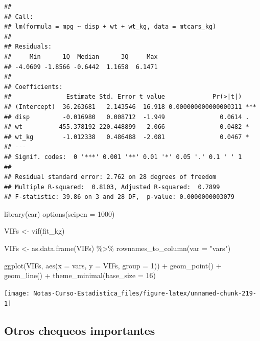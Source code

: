 \documentclass[
  12pt,
]{book}
\newenvironment{Shaded}{\begin{snugshade}}{\end{snugshade}}
\newcommand{\AttributeTok}[1]{\textcolor[rgb]{0.77,0.63,0.00}{#1}}
\newcommand{\DecValTok}[1]{\textcolor[rgb]{0.00,0.00,0.81}{#1}}
\newcommand{\FunctionTok}[1]{\textcolor[rgb]{0.00,0.00,0.00}{#1}}
\newcommand{\NormalTok}[1]{#1}
\newcommand{\OtherTok}[1]{\textcolor[rgb]{0.56,0.35,0.01}{#1}}
\newcommand{\SpecialCharTok}[1]{\textcolor[rgb]{0.00,0.00,0.00}{#1}}
\newcommand{\StringTok}[1]{\textcolor[rgb]{0.31,0.60,0.02}{#1}}
\theoremstyle{definition}
\theoremstyle{definition}
\theoremstyle{definition}
\theoremstyle{remark}
\begin{document}
\begin{verbatim}
## 
## Call:
## lm(formula = mpg ~ disp + wt + wt_kg, data = mtcars_kg)
## 
## Residuals:
##     Min      1Q  Median      3Q     Max 
## -4.0609 -1.8566 -0.6442  1.1658  6.1471 
## 
## Coefficients:
##               Estimate Std. Error t value             Pr(>|t|)    
## (Intercept)  36.263681   2.143546  16.918 0.000000000000000311 ***
## disp         -0.016980   0.008712  -1.949               0.0614 .  
## wt          455.378192 220.448899   2.066               0.0482 *  
## wt_kg        -1.012338   0.486488  -2.081               0.0467 *  
## ---
## Signif. codes:  0 '***' 0.001 '**' 0.01 '*' 0.05 '.' 0.1 ' ' 1
## 
## Residual standard error: 2.762 on 28 degrees of freedom
## Multiple R-squared:  0.8103, Adjusted R-squared:  0.7899 
## F-statistic: 39.86 on 3 and 28 DF,  p-value: 0.0000000003079
\end{verbatim}

\begin{Shaded}
\begin{Highlighting}[]
\FunctionTok{library}\NormalTok{(car)}
\FunctionTok{options}\NormalTok{(}\AttributeTok{scipen =} \DecValTok{1000}\NormalTok{)}

\NormalTok{VIFs }\OtherTok{\textless{}{-}} \FunctionTok{vif}\NormalTok{(fit\_kg)}

\NormalTok{VIFs }\OtherTok{\textless{}{-}} \FunctionTok{as.data.frame}\NormalTok{(VIFs) }\SpecialCharTok{\%\textgreater{}\%} \FunctionTok{rownames\_to\_column}\NormalTok{(}\AttributeTok{var =} \StringTok{"vars"}\NormalTok{)}

\FunctionTok{ggplot}\NormalTok{(VIFs, }\FunctionTok{aes}\NormalTok{(}\AttributeTok{x =}\NormalTok{ vars, }\AttributeTok{y =}\NormalTok{ VIFs, }\AttributeTok{group =} \DecValTok{1}\NormalTok{)) }\SpecialCharTok{+} 
    \FunctionTok{geom\_point}\NormalTok{() }\SpecialCharTok{+} \FunctionTok{geom\_line}\NormalTok{() }\SpecialCharTok{+} \FunctionTok{theme\_minimal}\NormalTok{(}\AttributeTok{base\_size =} \DecValTok{16}\NormalTok{)}
\end{Highlighting}
\end{Shaded}

\begin{center}\texttt{[image: Notas-Curso-Estadistica\_files/figure-latex/unnamed-chunk-219-1]} \end{center}

\hypertarget{otros-chequeos-importantes}{%
\subsection{Otros chequeos importantes}\label{otros-chequeos-importantes}}
\end{document}
